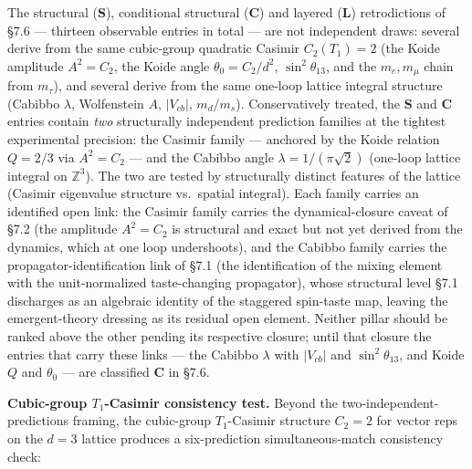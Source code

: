 \documentclass[
]{article}
\begin{document}
The structural (\textbf{S}), conditional structural (\textbf{C}) and
layered (\textbf{L}) retrodictions of §7.6 --- thirteen observable
entries in total --- are not independent draws: several derive from the
same cubic-group quadratic Casimir \(C_2(T_1) = 2\) (the Koide amplitude
\(A^2 = C_2\), the Koide angle \(\theta_0 = C_2/d^2\),
\(\sin^2\theta_{13}\), and the \(m_e, m_\mu\) chain from \(m_\tau\)),
and several derive from the same one-loop lattice integral structure
(Cabibbo \(\lambda\), Wolfenstein \(A\), \(|V_{cb}|\), \(m_d/m_s\)).
Conservatively treated, the \textbf{S} and \textbf{C} entries contain
\emph{two} structurally independent prediction families at the tightest
experimental precision: the Casimir family --- anchored by the Koide
relation \(Q = 2/3\) via \(A^2 = C_2\) --- and the Cabibbo angle
\(\lambda = 1/(\pi\sqrt{2})\) (one-loop lattice integral on
\(\mathbb{Z}^3\)). The two are tested by structurally distinct features
of the lattice (Casimir eigenvalue structure vs.~spatial integral). Each
family carries an identified open link: the Casimir family carries the
dynamical-closure caveat of §7.2 (the amplitude \(A^2 = C_2\) is
structural and exact but not yet derived from the dynamics, which at one
loop undershoots), and the Cabibbo family carries the
propagator-identification link of §7.1 (the identification of the mixing
element with the unit-normalized taste-changing propagator), whose
structural level §7.1 discharges as an algebraic identity of the
staggered spin-taste map, leaving the emergent-theory dressing as its
residual open element. Neither pillar should be ranked above the other
pending its respective closure; until that closure the entries that
carry these links --- the Cabibbo \(\lambda\) with \(|V_{cb}|\) and
\(\sin^2\theta_{13}\), and Koide \(Q\) and \(\theta_0\) --- are
classified \textbf{C} in §7.6.

\textbf{Cubic-group \(T_1\)-Casimir consistency test.} Beyond the
two-independent-predictions framing, the cubic-group \(T_1\)-Casimir
structure \(C_2 = 2\) for vector reps on the \(d = 3\) lattice produces
a six-prediction simultaneous-match consistency check:
\end{document}
